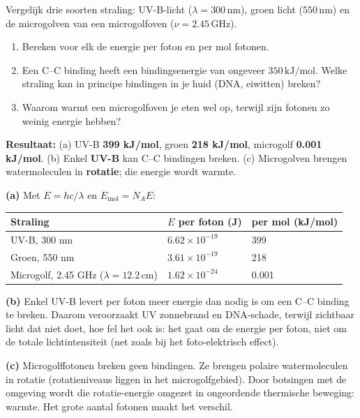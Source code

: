 \begin{oefening}
Vergelijk drie soorten straling: UV-B-licht (\(\lambda = 300\,\mathrm{nm}\)), groen licht (\(550\,\mathrm{nm}\)) en de microgolven van een microgolfoven (\(\nu = 2.45\,\mathrm{GHz}\)).

\begin{enumerate}
\item[(a)]
  Bereken voor elk de energie per foton en per mol fotonen.
\item[(b)]
  Een C--C binding heeft een bindingsenergie van ongeveer \(350\,\mathrm{kJ/mol}\). Welke straling kan in principe bindingen in je huid (DNA, eiwitten) breken?
\item[(c)]
  Waarom warmt een microgolfoven je eten wel op, terwijl zijn fotonen zo weinig energie hebben?
\end{enumerate}
\end{oefening}
\begin{oplossing}
\textbf{Resultaat:} (a) UV-B \textbf{399 kJ/mol}, groen \textbf{218 kJ/mol}, microgolf \textbf{0.001 kJ/mol}. (b) Enkel \textbf{UV-B} kan C--C bindingen breken. (c) Microgolven brengen watermoleculen in \textbf{rotatie}; die energie wordt warmte.

\textbf{(a)} Met \(E = hc/\lambda\) en \(E_{\text{mol}} = N_A E\):

\begin{center}
\begin{tabular}{lll}
\toprule
Straling & \(E\) per foton (J) & per mol (kJ/mol) \\
\midrule
UV-B, 300 nm & \(6.62\times10^{-19}\) & 399 \\
Groen, 550 nm & \(3.61\times10^{-19}\) & 218 \\
Microgolf, 2.45 GHz (\(\lambda = 12.2\,\mathrm{cm}\)) & \(1.62\times10^{-24}\) & 0.001 \\
\bottomrule
\end{tabular}
\end{center}

\textbf{(b)} Enkel UV-B levert per foton meer energie dan nodig is om een C--C binding te breken. Daarom veroorzaakt UV zonnebrand en DNA-schade, terwijl zichtbaar licht dat niet doet, hoe fel het ook is: het gaat om de energie per foton, niet om de totale lichtintensiteit (net zoals bij het foto-elektrisch effect).

\textbf{(c)} Microgolffotonen breken geen bindingen. Ze brengen polaire watermoleculen in rotatie (rotatieniveaus liggen in het microgolfgebied). Door botsingen met de omgeving wordt die rotatie-energie omgezet in ongeordende thermische beweging: warmte. Het grote aantal fotonen maakt het verschil.
\end{oplossing}

